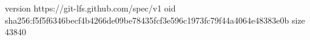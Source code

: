 version https://git-lfs.github.com/spec/v1
oid sha256:f5f5f6346becf4b4266de09be78435fcf3e596c1973fc79f44a4064e48383e0b
size 43840
